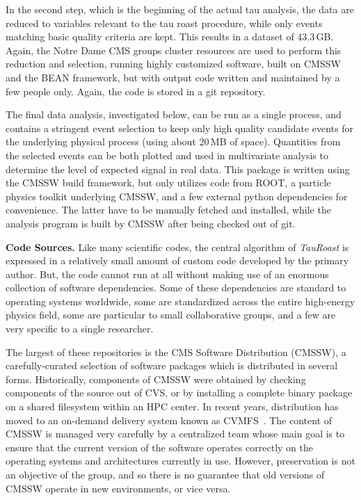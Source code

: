 \documentclass{sig-alternate}
\begin{document}
In the second step, which is the beginning of the actual tau analysis,
the data are reduced to variables relevant to the tau roast procedure, while
only events matching basic quality criteria are kept.  This results in
a dataset of 43.3$\,$GB.  Again, the Notre Dame CMS groups cluster
resources are used to perform this reduction and selection,
running highly customized software,
built on CMSSW and the BEAN framework,
but with output code written and maintained by a few people only.
Again, the code is stored in a git repository.

The final data analysis, investigated below, can be run as a single
process, and contains a stringent event selection to keep only high
quality candidate events for the underlying physical process (using
about 20$\,$MB of space).  Quantities from the selected events can be
both plotted and used in multivariate analysis to determine the level
of expected signal in real data.
This package is written using the CMSSW build framework,
but only utilizes code from ROOT,
a particle physics toolkit underlying CMSSW,
and a few external python dependencies for convenience.
The latter have to be manually fetched and installed,
while the analysis program is built by CMSSW after being checked out of git.

{\bf Code Sources.} Like many scientific codes, the central algorithm
of \emph{TauRoast} is expressed in a relatively small amount of
custom code developed by the primary author.  But, the code cannot
run at all without making use of an enormous collection of software
dependencies.  Some of these dependencies are standard to operating
systems worldwide, some are standardized across the entire high-energy
physics field, some are particular to small collaborative groups,
and a few are very specific to a single researcher.

The largest of these repositories is the CMS Software Distribution (CMSSW),
a carefully-curated selection of software packages which is distributed
in several forms.  Historically, components of CMSSW were obtained by checking components
of the source out of CVS, or by installing a complete binary package on a shared
filesystem within an HPC center.  In recent years, distribution has moved to
an on-demand delivery system known as CVMFS~\cite{blomer2011cernvm}.  The content
of CMSSW is managed very carefully by a centralized team whose main goal
is to ensure that the current version of the software operates correctly
on the operating systems and architectures currently in use.  However,
preservation is not an objective of the group, and so there is
no guarantee that old versions of CMSSW operate in new environments,
or vice versa. 
\end{document}
